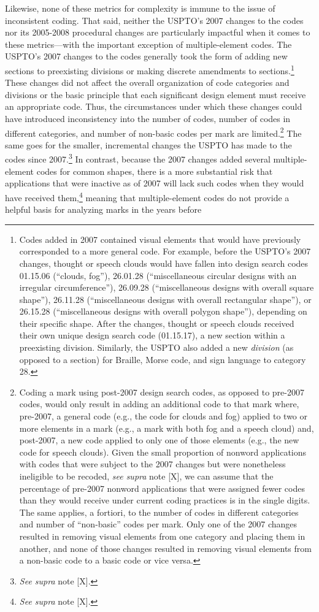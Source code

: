 \documentclass[letterpaper, 11pt, oneside]{article}
\begin{document}
Likewise, none of these metrics for complexity is immune to the issue of inconsistent coding. That said, neither the USPTO's 2007 changes to the codes nor its 2005-2008 procedural changes are particularly impactful when it comes to these metrics—with the important exception of multiple-element codes. The USPTO's 2007 changes to the codes generally took the form of adding new sections to preexisting divisions or making discrete amendments to sections.\footnote{Codes added in 2007 contained visual elements that would have previously corresponded to a more general code. For example, before the USPTO's 2007 changes, thought or speech clouds would have fallen into design search codes 01.15.06 (``clouds, fog''), 26.01.28 (``miscellaneous circular designs with an irregular circumference''), 26.09.28 (``miscellaneous designs with overall square shape''), 26.11.28 (``miscellaneous designs with overall rectangular shape''), or 26.15.28 (``miscellaneous designs with overall polygon shape''), depending on their specific shape. After the changes, thought or speech clouds received their own unique design search code (01.15.17), a new section within a preexisting division. Similarly, the USPTO also added a new \emph{division} (as opposed to a section) for Braille, Morse code, and sign language to category 28.} These changes did not affect the overall organization of code categories and divisions or the basic principle that each significant design element must receive an appropriate code. Thus, the circumstances under which these changes could have introduced inconsistency into the number of codes, number of codes in different categories, and number of non-basic codes per mark are limited.\footnote{Coding a mark using post-2007 design search codes, as opposed to pre-2007 codes, would only result in adding an additional code to that mark where, pre-2007, a general code (e.g., the code for clouds and fog) applied to two or more elements in a mark (e.g., a mark with both fog and a speech cloud) and, post-2007, a new code applied to only one of those elements (e.g., the new code for speech clouds). Given the small proportion of nonword applications with codes that were subject to the 2007 changes but were nonetheless ineligible to be recoded, \textit{see supra} note [X], we can assume that the percentage of pre-2007 nonword applications that were assigned fewer codes than they would receive under current coding practices is in the single digits. The same applies, a fortiori, to the number of codes in different categories and number of ``non-basic'' codes per mark. Only one of the 2007 changes resulted in removing visual elements from one category and placing them in another, and none of those changes resulted in removing visual elements from a non-basic code to a basic code or vice versa.} The same goes for the smaller, incremental changes the USPTO has made to the codes since 2007.\footnote{\textit{See supra} note [X].} In contrast, because the 2007 changes added several multiple-element codes for common shapes, there is a more substantial risk that applications that were inactive as of 2007 will lack such codes when they would have received them,\footnote{\textit{See supra} note [X].} meaning that multiple-element codes do not provide a helpful basis for analyzing marks in the years before 
\end{document}
